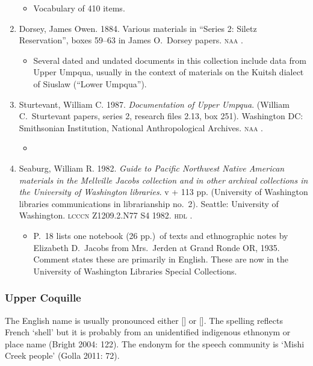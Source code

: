 \documentclass[12pt,letterpaper,oneside,article]{memoir}
\begin{document}
\begin{enumerate}
\begin{itemize}
	\item	Vocabulary of 410 items.
	\end{itemize}
\item	Dorsey, James Owen.
	1884.
	Various materials in “Series 2: Siletz Reservation”, boxes 59–63 in
	James O.\ Dorsey papers.
	\textsc{naa} .
	\begin{itemize}
	\item	Several dated and undated documents in this collection include data from
		Upper Umpqua, usually in the context of materials on the Kuitsh dialect of
		Siuslaw (“Lower Umpqua”).
	\end{itemize}
\item	Sturtevant, William C.
	1987.
	\textit{Documentation of Upper Umpqua}.
	(William C.\ Sturtevant papers, series 2, research files 2.13, box 251).
	Washington DC: Smithsonian Institution, National Anthropological Archives.
	\textsc{naa} .
	\begin{itemize}
	\item	{}
	\end{itemize}
\item	Seaburg, William R.
	1982.
	\textit{Guide to Pacific Northwest Native American materials in the Mellville Jacobs
		collection and in other archival collections in the University of Washington
		libraries}.
	v + 113 pp.
	(University of Washington libraries communications in librarianship no.\ 2).
	Seattle: University of Washington.
	\textsc{lcccn} Z1209.2.N77 S4 1982.
	\textsc{hdl} .
	\begin{itemize}
	\item	P.\ 18 lists one notebook (26 pp.)\ of texts and
		ethnographic notes by Elizabeth D.\ Jacobs from Mrs.\ Jerden at Grand Ronde OR,
		1935.
		Comment states these are primarily in English.
		These are now in the University of Washington Libraries Special Collections.
	\end{itemize}
\end{enumerate}

\subsubsection{Upper Coquille}\label{sec:coquille}

The English name  is usually pronounced either [] or [].
The spelling reflects French  ‘shell’ but it is probably from an unidentified indigenous ethnonym or place name (Bright 2004: 122).
The endonym for the speech community is  ‘Mishi Creek people’ (Golla 2011: 72). 
\end{document}
